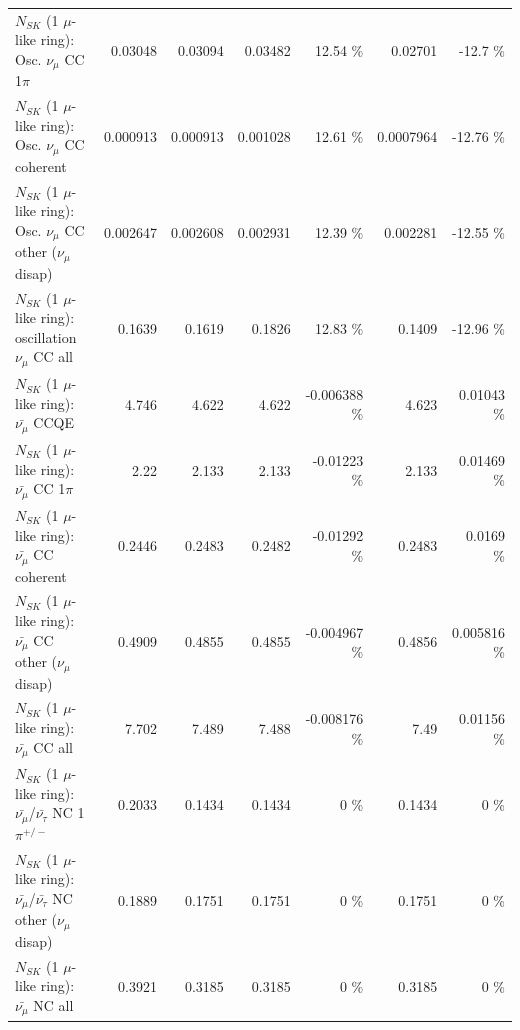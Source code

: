 \begin{table}
\begin{tabular}{| l | r | r | r  r | r  r |}
                          $N_{SK}$ (1 $\mu$-like ring): Osc. $\nu_\mu$ CC 1$\pi$ &         0.03048 &         0.03094 &         0.03482 &    12.54 \%  &         0.02701 &    -12.7 \%  \\ 
                        $N_{SK}$ (1 $\mu$-like ring): Osc. $\nu_\mu$ CC coherent &        0.000913 &        0.000913 &        0.001028 &    12.61 \%  &       0.0007964 &   -12.76 \%  \\ 
         $N_{SK}$ (1 $\mu$-like ring): Osc. $\nu_\mu$ CC other ($\nu_\mu$ disap) &        0.002647 &        0.002608 &        0.002931 &    12.39 \%  &        0.002281 &   -12.55 \%  \\ 
                      $N_{SK}$ (1 $\mu$-like ring): oscillation $\nu_\mu$ CC all &          0.1639 &          0.1619 &          0.1826 &    12.83 \%  &          0.1409 &   -12.96 \%  \\ 
\hline
\hline
                              $N_{SK}$ (1 $\mu$-like ring): $\bar{\nu_\mu}$ CCQE &           4.746 &           4.622 &           4.622 & -0.006388 \%  &           4.623 &  0.01043 \%  \\ 
                         $N_{SK}$ (1 $\mu$-like ring): $\bar{\nu_\mu}$ CC 1$\pi$ &            2.22 &           2.133 &           2.133 & -0.01223 \%  &           2.133 &  0.01469 \%  \\ 
                       $N_{SK}$ (1 $\mu$-like ring): $\bar{\nu_\mu}$ CC coherent &          0.2446 &          0.2483 &          0.2482 & -0.01292 \%  &          0.2483 &   0.0169 \%  \\ 
        $N_{SK}$ (1 $\mu$-like ring): $\bar{\nu_\mu}$ CC other ($\nu_\mu$ disap) &          0.4909 &          0.4855 &          0.4855 & -0.004967 \%  &          0.4856 & 0.005816 \%  \\ 
                          $N_{SK}$ (1 $\mu$-like ring): $\bar{\nu_{\mu}}$ CC all &           7.702 &           7.489 &           7.488 & -0.008176 \%  &            7.49 &  0.01156 \%  \\ 
\hline
  $N_{SK}$ (1 $\mu$-like ring): $\bar{\nu_\mu}$/$\bar{\nu_\tau}$ NC 1$\pi^{+/-}$ &          0.2033 &          0.1434 &          0.1434 &        0 \%  &          0.1434 &        0 \%  \\ 
$N_{SK}$ (1 $\mu$-like ring): $\bar{\nu_\mu}$/$\bar{\nu_\tau}$ NC other ($\nu_\mu$ disap) &          0.1889 &          0.1751 &          0.1751 &        0 \%  &          0.1751 &        0 \%  \\ 
                          $N_{SK}$ (1 $\mu$-like ring): $\bar{\nu_{\mu}}$ NC all &          0.3921 &          0.3185 &          0.3185 &        0 \%  &          0.3185 &        0 \%  \\ 

\end{tabular}
\end{table}
